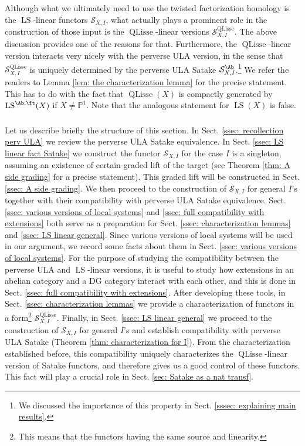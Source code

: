 \documentclass[10pt]{amsart}
\newcommand{\sssec}{\subsubsection}
\theoremstyle{remark}
\newcommand{\pjl}{\mathbb{P}^1}
\newcommand{\on}{\operatorname}
\newcommand{\cS}{\mathcal{S}}
\newcommand{\LS}{\on{LS}}
\newcommand{\QLisse}{\on{QLisse}}
\begin{document}
Although what we ultimately need to use the twisted factorization homology is the $\LS$-linear functors $\cS_{X,I}$, what actually plays a prominent role in the construction of those input is the $\QLisse$-linear versions $\cS^{\QLisse}_{X,I}$. The above discussion provides one of the reasons for that. Furthermore, the $\QLisse$-linear version interacts very nicely with the perverse ULA version, in the sense that $\cS^{\QLisse}_{X,I}$ is uniquely determined by the perverse ULA Satake $\cS^{\Ab}_{X,I}$.\footnote{We discussed the importance of this property in Sect. \ref{sssec: explaining main results}.} We refer the readers to Lemma \ref{lem: the characterization lemma} for the precise statement. This has to do with the fact that $\QLisse(X)$ is compactly generated by $\LS^{\Ab,\ft}(X)$ if $X\ne \pjl$. Note that the analogous statement for $\LS(X)$ is false.

 
\sssec{}
Let us describe briefly the structure of this section.
In Sect. \ref{ssec: recollection perv ULA} we review the perverse ULA Satake equivalence. In Sect. \ref{ssec: LS linear fact Satake} we construct the functor $\cS_{X,I}$ for the case $I$ is a singleton, assuming an existence of certain graded lift of the target (see Theorem \ref{thm: A side grading} for a precise statement). This graded lift will be constructed in Sect. \ref{ssec: A side grading}. We then proceed to the construction of $\cS_{X,I}$ for general $I$'s together with their compatibility with perverse ULA Satake equivalence. Sect. \ref{ssec: various versions of local systems} and \ref{ssec: full compatibility with extensions} both serve as a preparation for Sect. \ref{ssec: characterization lemmas} and \ref{ssec: LS linear general}. Since various versions of local systems will be used in our argument, we record some facts about them in Sect. \ref{ssec: various versions of local systems}. For the purpose of studying the compatibility between the perverse ULA and $\LS$-linear versions, it is useful to study how extensions in an abelian category and a DG category interact with each other, and this is done in Sect. \ref{ssec: full compatibility with extensions}. After developing these tools, in Sect. \ref{ssec: characterization lemmas} we provide a characterization of functors in a form\footnote{This means that the functors having the same source and linearity.} $\cS^{\QLisse}_{X,I}$. Finally, in Sect. \ref{ssec: LS linear general} we proceed to the construction of $\cS_{X,I}$ for general $I$'s and establish compatibility with perverse ULA Satake (Theorem \ref{thm: characterization for I}). From the characterization established before, this compatibility uniquely characterizes the $\QLisse$-linear version of Satake functors, and therefore gives us a good control of these functors. This fact will play a crucial role in Sect. \ref{sec: Satake as a nat transf}.
\end{document}
